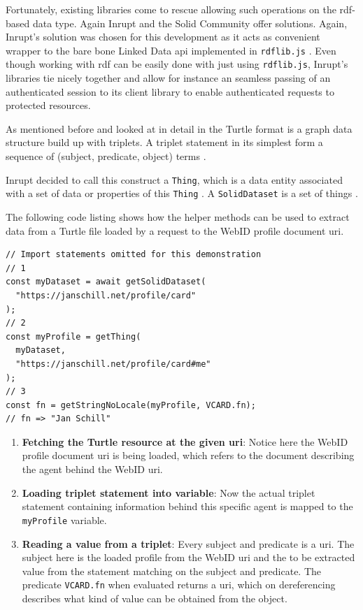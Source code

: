 Fortunately, existing libraries come to rescue allowing such operations on the \gls{rdf}-based data type. Again Inrupt and the Solid Community offer solutions. Again, Inrupt's solution was chosen for this development as it acts as convenient wrapper to the bare bone Linked Data \gls{api} implemented in \texttt{rdflib.js} \cite{rdflib-js}. Even though working with \gls{rdf} can be easily done with just using \texttt{rdflib.js}, Inrupt's libraries tie nicely together and allow for instance an seamless passing of an authenticated session to its client library to enable authenticated requests to protected resources.

As mentioned before and looked at in detail in \cite{cern-solid-investigation-spec} the Turtle format is a graph data structure build up with triplets. A triplet statement in its simplest form a sequence of (subject, predicate, object) terms \cite{Prud:hommeaux:14:RT}. 

Inrupt decided to call this construct a \texttt{Thing}, which is a data entity associated with a set of data or properties of this \texttt{Thing} \cite{thing}. A \texttt{SolidDataset} is a set of things \cite{inrupt-dataset}.

The following code listing shows how the helper methods can be used to extract data from a Turtle file loaded by a request to the WebID profile document \gls{uri}.

\begin{lstlisting}[language=Other,columns=fullflexible, caption={Basic usage of Inrupt's solid-client library.}, label={lst:2}]
// Import statements omitted for this demonstration
// 1
const myDataset = await getSolidDataset(
  "https://janschill.net/profile/card"
);
// 2
const myProfile = getThing(
  myDataset,
  "https://janschill.net/profile/card#me"
);
// 3
const fn = getStringNoLocale(myProfile, VCARD.fn);
// fn => "Jan Schill"
\end{lstlisting}

\begin{enumerate}
    \item \textbf{Fetching the Turtle resource at the given \gls{uri}}: Notice here the WebID profile document \gls{uri} is being loaded, which refers to the document describing the agent behind the WebID \gls{uri}.
    \item \textbf{Loading triplet statement into variable}: Now the actual triplet statement containing information behind this specific agent is mapped to the \texttt{myProfile} variable.
    \item \textbf{Reading a value from a triplet}: Every subject and predicate is a \gls{uri}. The subject here is the loaded profile from the WebID \gls{uri} and the to be extracted value from the statement matching on the subject and predicate. The predicate \texttt{VCARD.fn} when evaluated returns a \gls{uri}, which on dereferencing describes what kind of value can be obtained from the object.
\end{enumerate}

